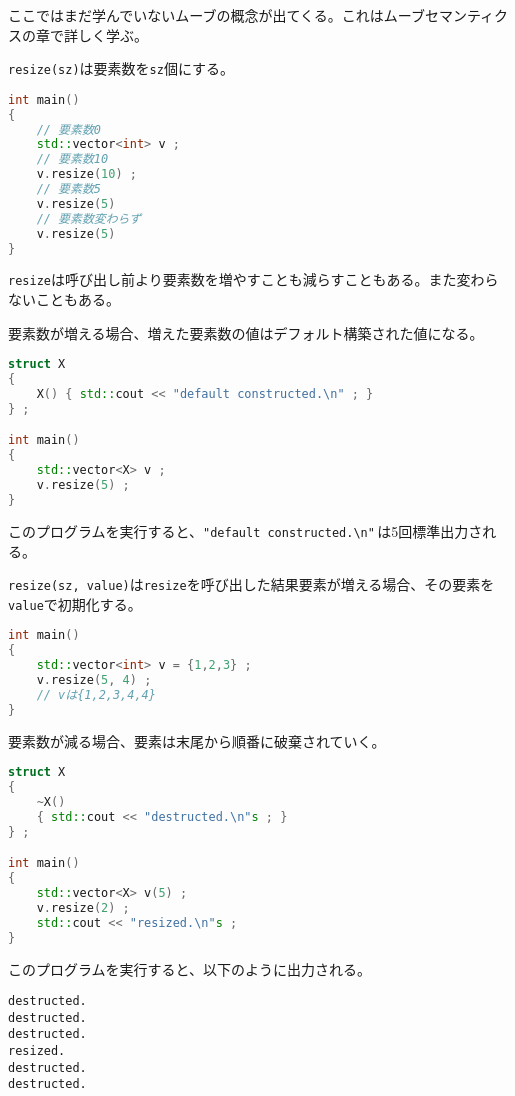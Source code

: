 ここではまだ学んでいないムーブの概念が出てくる。これはムーブセマンティクスの章で詳しく学ぶ。

\clearpage
{}

\texttt{resize(sz)}は要素数を\texttt{sz}個にする。

\begin{lstlisting}[language={C++}]
int main()
{
    // 要素数0
    std::vector<int> v ;
    // 要素数10
    v.resize(10) ;
    // 要素数5
    v.resize(5)
    // 要素数変わらず
    v.resize(5)
}
\end{lstlisting}

\texttt{resize}は呼び出し前より要素数を増やすことも減らすこともある。また変わらないこともある。

要素数が増える場合、増えた要素数の値はデフォルト構築された値になる。

\begin{lstlisting}[language={C++}]
struct X
{
    X() { std::cout << "default constructed.\n" ; }
} ;

int main()
{
    std::vector<X> v ;
    v.resize(5) ;
}
\end{lstlisting}

このプログラムを実行すると、\texttt{"default constructed.{\textbackslash}n"}\,は5回標準出力される。

\texttt{resize(sz, value)}は\texttt{resize}を呼び出した結果要素が増える場合、その要素を\texttt{value}で初期化する。

\begin{lstlisting}[language={C++}]
int main()
{
    std::vector<int> v = {1,2,3} ;
    v.resize(5, 4) ;
    // vは{1,2,3,4,4} 
}
\end{lstlisting}

要素数が減る場合、要素は末尾から順番に破棄されていく。

\ifTombow\pagebreak\fi
\begin{lstlisting}[language={C++}]
struct X
{
    ~X()
    { std::cout << "destructed.\n"s ; }
} ;

int main()
{
    std::vector<X> v(5) ;
    v.resize(2) ;
    std::cout << "resized.\n"s ;
}
\end{lstlisting}

このプログラムを実行すると、以下のように出力される。

\begin{lstlisting}[style=terminal]
destructed.
destructed.
destructed.
resized.
destructed.
destructed.
\end{lstlisting}

